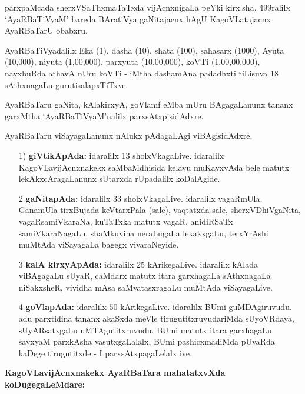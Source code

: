 parxpaMcada sherxVSaThxmaTaTxda vijAcnxnigaLa peYki kirx.sha. {\rm 499}ralilx `AyaRBaTiVyaM' bareda BAratiVya gaNitajacnx hAgU KagoVLatajacnx AyaRBaTarU obabxru.

AyaRBaTiVyadalilx Eka ({\rm 1}), dasha ({\rm 10}), shata ({\rm 100}), sahasarx ({\rm 1000}), Ayuta ({\rm 10,000}), niyuta ({\rm 1,00,000}), parxyuta ({\rm 10,00,000}), koVTi ({\rm 1,00,00,000}), nayxbuRda athavA nUru koVTi - iMtha dashamAna padadhxti tiLisuva {\rm 18} sAthxnagaLu gurutisalapxTiTxve.


AyaRBaTaru gaNita, kAlakirxyA, goVlamf eMba mUru BAgagaLanunx tananx garxMtha `AyaRBaTiVyaM'nalilx parxsAtxpisidAdxre.

AyaRBaTaru viSayagaLanunx nAlukx pAdagaLAgi viBAgisidAdxre.
\begin{itemize}
\item[{\rm 1)}] {\bf giVtikApAda:} idaralilx {\rm 13} sholxVkagaLive. idaralilx KagoVLavijAcnxnakekx saMbaMdhisida kelavu muKayxvAda bele matutx lekAkxcAragaLanunx sUtarxda rUpadalilx koDalAgide.

\item[{\rm 2}] {\bf gaNitapAda:} idaralilx {\rm 33} sholxVkagaLive. idaralilx vagaRmUla, GanamUla tirxBujada keVtarxPala (sale), vaqtatxda sale, sherxVDhiVgaNita, vagaRsamiVkaraNa, kuTaTxka matutx vagaR, anidiRSaTx samiVkaraNagaLu, shaMkuvina neraLugaLa lekakxgaLu, terxYrAshi muMtAda viSayagaLa bagegx vivaraNeyide. 
  
\item[{\rm 3}] {\bf kalA kirxyApAda:} idaralilx {\rm 25} kArikegaLive. idaralilx kAlada viBAgagaLu sUyaR, caMdarx matutx itara garxhagaLa sAthxnagaLa niSakxsheR, vividha mAsa saMvatasxragaLu muMtAda viSayagaLive.
 
\item[{\rm 4}] {\bf goVlapAda:} idaralilx $50$ kArikegaLive. idaralilx BUmi guMDAgiruvudu. adu parxtidina tananx akaSxda meVle tirugutitxruvudariMda sUyoVRdaya, sUyARsatxgaLu uMTAgutitxruvudu. BUmi matutx itara garxhagaLu savxyaM parxkAsha vasutxgaLalalx, BUmi pashicxmadiMda pUvaRda kaDege tirugutitxde - I parxsAtxpagaLelalx ive.
  \end{itemize}

\eject

\noindent
{\bf KagoVLavijAcnxnakekx AyaRBaTara mahatatxvXda koDugegaLeMdare:}

